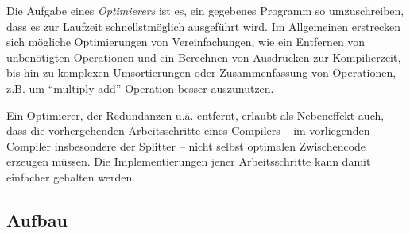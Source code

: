 \documentclass[twoside,a4paper,fleqn,12pt]{book}
\begin{document}
\newcommand\OptSample[2]{
  \begin{figure}[!h]
    \centering
    \begin{minipage}{8cm}\end{minipage}
    \begin{minipage}{10cm}\end{minipage}
    \vspace{0.3em}
    \begin{minipage}{10cm}\end{minipage}
    \caption{#2.}
    \label{fig:ir_optex_#1}
  \end{figure}
}
\newcommand\OptSampleStacked[2]{
  \begin{figure}[!h]
    \centering
    \begin{minipage}{8cm}\end{minipage}
    \begin{minipage}{10cm}\end{minipage}\\
    \vspace{0.3em}
    \begin{minipage}{10cm}\end{minipage}
    \caption{#2.}
    \label{fig:ir_optex_#1}
  \end{figure}
}

Die Aufgabe eines \emph{Optimierers} ist es, ein gegebenes Programm so umzuschreiben, dass es zur Laufzeit
schnellstmöglich ausgeführt wird. Im Allgemeinen erstrecken sich mögliche Optimierungen von Vereinfachungen,
wie ein Entfernen von unbenötigten Operationen und ein Berechnen von Ausdrücken zur Kompilierzeit,
bis hin zu komplexen Umsortierungen oder Zusammenfassung von Operationen, z.B. um ``multiply-add''-Operation
besser auszunutzen.

Ein Optimierer, der Redundanzen u.ä. entfernt, erlaubt als Nebeneffekt auch, dass die vorhergehenden Arbeitsschritte
eines Compilers -- im vorliegenden Compiler insbesondere der Splitter --
nicht selbst optimalen Zwischencode erzeugen müssen. Die Implementierungen jener Arbeitsschritte kann damit
einfacher gehalten werden.

\subsection{Aufbau}
\end{document}
